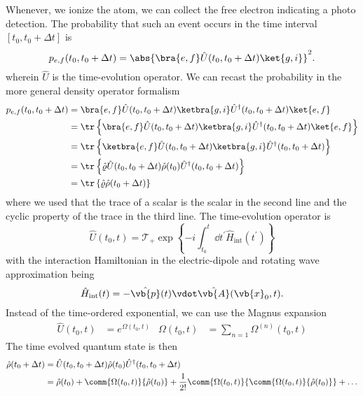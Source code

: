 Whenever, we ionize the atom, we can collect the free electron indicating a photo detection.
The probability that such an event occurs in the time interval $[t_0,t_0+\Delta t]$ is
\begin{equation}
	p_{e,f}(t_0,t_0+\Delta t)
	=
	\abs{
		\bra{e,f}
		\hat{U}(t_0,t_0+\Delta t)
		\ket{g,i}
	}^2
	.
\end{equation}
wherein $\hat{U}$ is the time-evolution operator.
We can recast the probability in the more general density operator formalism
\begin{equation}
	\begin{split}
		p_{e,f}(t_0,t_0+\Delta t)
		&=
		\bra{e,f}
		\hat{U}(t_0,t_0+\Delta t)
		\ketbra{g,i}
		\hat{U}^\dagger(t_0,t_0+\Delta t)
		\ket{e,f}
		\\
		&=
		\tr\left\{
			\bra{e,f}
			\hat{U}(t_0,t_0+\Delta t)
			\ketbra{g,i}
			\hat{U}^\dagger(t_0,t_0+\Delta t)
			\ket{e,f}
		\right\}
		\\
		&=
		\tr\left\{
			\ketbra{e,f}
			\hat{U}(t_0,t_0+\Delta t)
			\ketbra{g,i}
			\hat{U}^\dagger(t_0,t_0+\Delta t)
		\right\}
		\\
		&=
		\tr\left\{
			\hat\varrho
			\hat{U}(t_0,t_0+\Delta t)
			\hat\rho(t_0)
			\hat{U}^\dagger(t_0,t_0+\Delta t)
		\right\}
		\\
		&=
		\tr\left\{
			\hat\varrho
			\hat\rho(t_0+\Delta t)
		\right\}
	\end{split}
\end{equation}
where we used that the trace of a scalar is the scalar in the second line and the cyclic property of the trace in the third line.
The time-evolution operator is
\begin{equation}
	\hat{U}(t_0,t)
	=
	\mathcal{T}_+
	\exp\left\{
		-i
		\int_{t_0}^t\dd{t^\prime}
		\hat{H}_\text{int}(t^\prime)
	\right\}
\end{equation}
with the interaction Hamiltonian in the electric-dipole and rotating wave approximation being
\begin{equation}
	\hat{H}_\text{int}(t)
	=
	-
	\hat{\vb{p}}(t)
	\vdot
	\hat{\vb{A}}(\vb{x}_0,t)
	.
\end{equation}
Instead of the time-ordered exponential, we can use the Magnus expansion
\begin{align}
	\hat{U}(t_0,t)
	&=
	e^{\Omega(t_0,t)}
	&
	\Omega(t_0,t)
	&=
	\sum_{n=1}\Omega^{(n)}(t_0,t)
\end{align}
The time evolved quantum state is then
\begin{equation}
	\begin{split}
		\hat\rho(t_0+\Delta t)
		&=
		\hat{U}(t_0,t_0+\Delta t)
		\hat\rho(t_0)
		\hat{U}^\dagger(t_0,t_0+\Delta t)
		\\
		&=
		\hat\rho(t_0)
		+
		\comm{\Omega(t_0,t)}{\hat\rho(t_0)}
		+
		\frac{1}{2!}
		\comm{\Omega(t_0,t)}{\comm{\Omega(t_0,t)}{\hat\rho(t_0)}}
		+
		\dots
	\end{split}
\end{equation}
